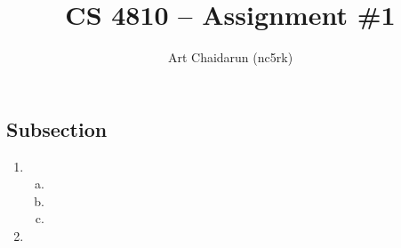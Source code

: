 \documentclass[letterpaper,12pt]{article}
\begin{document}
\title{\vspace{-0.5in}CS 4810 -- Assignment \#1}
\author{Art Chaidarun (nc5rk)}
\renewcommand{\today}{February 16, 2013}
\maketitle
\thispagestyle{empty}
\pagestyle{empty}

\subsection*{Subsection}

\begin{enumerate}
  \item
    \begin{enumerate}[a.]
      \item
      \item
      \item
    \end{enumerate}
  \item
\end{enumerate}
\end{document}

